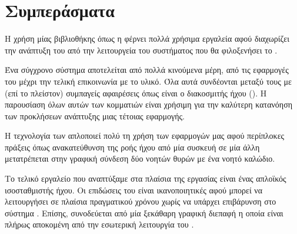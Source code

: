 \documentclass[12pt]{extarticle}
\begin{document}
\section{Συμπεράσματα}

Η χρήση μίας βιβλιοθήκης όπως η  φέρνει πολλά χρήσιμα εργαλεία 
αφού διαχωρίζει την ανάπτυξη του  από την λειτουργεία του συστήματος που 
θα φιλοξενήσει το . 

Ένα σύγχρονο σύστημα αποτελείται από πολλά κινούμενα μέρη, από τις εφαρμογές 
του μέχρι την τελική επικοινωνία με το υλικό. Όλα αυτά συνδέονται μεταξύ τους
με (επί το πλείστον) συμπαγείς αφαιρέσεις όπως είναι ο διακοσμιτής ήχου ().
Η παρουσίαση όλων αυτών των κομματιών είναι χρήσιμη για την καλύτερη κατανόηση 
των προκλήσεων ανάπτυξης μιας τέτοιας εφαρμογής.

Η τεχνολογία των  απλοποιεί πολύ 
τη χρήση των εφαρμογών μας αφού περίπλοκες πράξεις όπως ανακατεύθυνση της 
ροής ήχου από μία συσκευή σε μία άλλη μετατρέπεται στην γραφική σύνδεση
δύο νοητών θυρών με ένα νοητό καλώδιο.

Το τελικό εργαλείο που αναπτύξαμε στα πλαίσια της εργασίας είναι ένας απλοϊκός ισοσταθμιστής
ήχου. Οι επιδώσεις του είναι ικανοποιητικές αφού μπορεί να λειτουργήσει σε πλαίσια πραγματικού 
χρόνου χωρίς να υπάρχει επιβάρυνση στο σύστημα . Επίσης, συνοδεύεται 
από μία ξεκάθαρη γραφική διεπαφή η οποία είναι πλήρως αποκομένη από την εσωτερική λειτουργία
του .

\newpage


\end{document}
